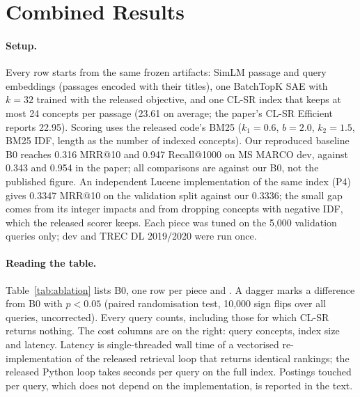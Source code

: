 
\section{Combined Results}
\label{sec:results}

\paragraph{Setup.}
Every row starts from the same frozen artifacts: SimLM passage and query embeddings (passages encoded with
their titles), one BatchTopK SAE with $k=32$ trained with the released objective, and one CL-SR index that
keeps at most 24 concepts per passage (23.61 on average; the paper's CL-SR Efficient reports 22.95). Scoring
uses the released code's BM25 ($k_1=0.6$, $b=2.0$, $k_2=1.5$, BM25 IDF, length as the number of indexed
concepts). Our reproduced baseline B0 reaches 0.316 MRR@10 and 0.947 Recall@1000 on
MS MARCO dev, against 0.343 and 0.954 in the paper; all comparisons are against our B0, not the published
figure. An independent Lucene implementation of the same index (P4) gives 0.3347 MRR@10 on the validation
split against our 0.3336; the small gap comes from its integer impacts and from dropping concepts with
negative IDF, which the released scorer keeps. Each piece was tuned on the 5{,}000
validation queries only; dev and TREC DL 2019/2020 were run once.

\paragraph{Reading the table.}
Table~\ref{tab:ablation} lists B0, one row per piece and . A dagger marks a
difference from B0 with $p<0.05$ (paired randomisation test, 10{,}000 sign flips over all queries, uncorrected).
Every query counts, including those for which CL-SR returns nothing. The cost columns are on the right: query
concepts, index size and latency. Latency is single-threaded wall time of a vectorised re-implementation of the
released retrieval loop that returns identical rankings; the released Python loop takes seconds per query on
the full index. Postings touched per query, which does not depend on the implementation, is reported in the
text.

